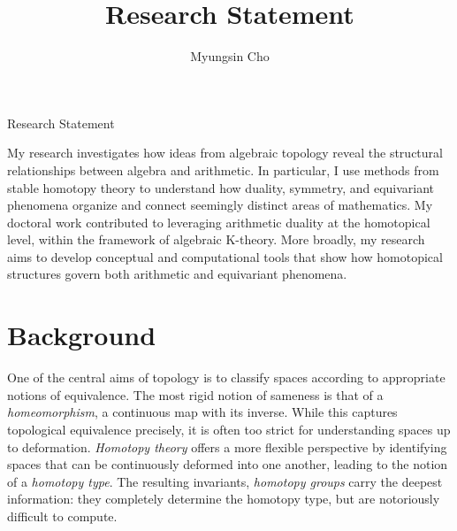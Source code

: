 \documentclass[11pt]{article}
\title{Research Statement}
\author{Myungsin Cho}
\date{}
\begin{document}
\begin{center}\LARGE{Research Statement}\end{center}\vspace{.5em}

My research investigates how ideas from algebraic topology reveal the structural relationships between algebra and arithmetic.
In particular, I use methods from stable homotopy theory to understand how duality, symmetry, and equivariant phenomena organize and connect seemingly distinct areas of mathematics.
My doctoral work contributed to leveraging arithmetic duality at the homotopical level, within the framework of algebraic K-theory.
More broadly, my research aims to develop conceptual and computational tools that show how homotopical structures govern both arithmetic and equivariant phenomena.

\section{Background}
One of the central aims of topology is to classify spaces according to appropriate notions of equivalence.  
The most rigid notion of sameness is that of a {\it homeomorphism}, a continuous map with its inverse.  
While this captures topological equivalence precisely, it is often too strict for understanding spaces up to deformation.  
{\it Homotopy theory} offers a more flexible perspective by identifying spaces that can be continuously deformed into one another, leading to the notion of a {\it homotopy type}.  
The resulting invariants, {\it homotopy groups} carry the deepest information: they completely determine the homotopy type, but are notoriously difficult to compute.
\end{document}
